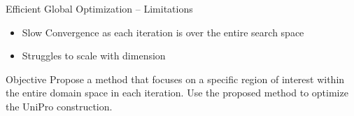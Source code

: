 \documentclass{beamer}
\begin{document}



\begin{frame}{Efficient Global Optimization -- Limitations}
\begin{itemize}
    \item Slow Convergence as each iteration is over the entire search space
    \item Struggles to scale with dimension %
\end{itemize}
\end{frame}



\begin{frame}{Objective}
    Propose a method that focuses on a specific region of interest within the entire domain space in each iteration.
    Use the proposed method to optimize the UniPro construction.
\end{frame}
\end{document}
